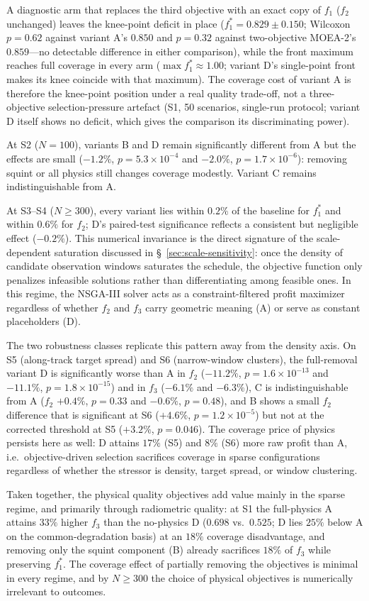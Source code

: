 A diagnostic arm that replaces the third objective with an exact copy of
$f_1$ ($f_2$ unchanged) leaves the knee-point deficit in place ($f_1^* =
0.829 \pm 0.150$; Wilcoxon $p=0.62$ against variant A's $0.850$ and
$p=0.32$ against two-objective MOEA-2's $0.859$---no detectable difference
in either comparison), while the front maximum reaches full coverage in
every arm ($\max f_1^* \approx 1.00$; variant D's single-point front makes
its knee coincide with that maximum). The coverage cost of variant A is
therefore the knee-point position under a real quality trade-off, not a
three-objective selection-pressure artefact (S1, 50 scenarios, single-run
protocol; variant D itself shows no deficit, which gives the comparison
its discriminating power).

At S2 ($N = 100$), variants B and D remain significantly different from A
but the effects are small ($-1.2\%$, $p=5.3\times10^{-4}$ and $-2.0\%$,
$p=1.7\times10^{-6}$): removing squint or all physics still changes coverage
modestly. Variant C remains indistinguishable from A.

At S3--S4 ($N \geq 300$), every variant lies within $0.2\%$ of the baseline
for $f_1^*$ and within $0.6\%$ for $f_2$; D's paired-test significance
reflects a consistent but negligible effect ($-0.2\%$). This numerical
invariance is the direct signature of the scale-dependent saturation
discussed in \S~\ref{sec:scale-sensitivity}: once the density of candidate
observation windows saturates the schedule, the objective function only
penalizes infeasible solutions rather than differentiating among feasible
ones. In this regime, the NSGA-III solver acts as a constraint-filtered
profit maximizer regardless of whether $f_2$ and $f_3$ carry geometric
meaning (A) or serve as constant placeholders (D).

The two robustness classes replicate this pattern away from the density
axis. On S5 (along-track target spread) and S6 (narrow-window clusters),
the full-removal variant D is significantly worse than A in $f_2$
($-11.2\%$, $p = 1.6\times10^{-13}$ and $-11.1\%$, $p = 1.8\times10^{-15}$)
and in $f_3$ ($-6.1\%$ and $-6.3\%$), C is indistinguishable from A
($f_2$ $+0.4\%$, $p = 0.33$ and $-0.6\%$, $p = 0.48$), and B shows a small
$f_2$ difference that is significant at S6 ($+4.6\%$,
$p = 1.2\times10^{-5}$) but not at the corrected threshold at S5
($+3.2\%$, $p = 0.046$). The coverage price of physics persists
here as well: D attains $17\%$ (S5) and $8\%$ (S6) more raw profit than A,
i.e.\ objective-driven selection sacrifices coverage in sparse
configurations regardless of whether the stressor is density, target
spread, or window clustering.

Taken together, the physical quality objectives add value mainly in the
sparse regime, and primarily through radiometric quality: at S1 the
full-physics A attains $33\%$ higher $f_3$ than the no-physics D
($0.698$ vs.\ $0.525$; D lies $25\%$ below A on the common-degradation
basis) at an $18\%$ coverage disadvantage, and removing
only the squint component (B) already sacrifices $18\%$ of $f_3$ while
preserving $f_1^*$. The coverage effect of partially removing the
objectives is minimal in every regime, and by $N \geq 300$ the choice of
physical objectives is numerically irrelevant to outcomes.
